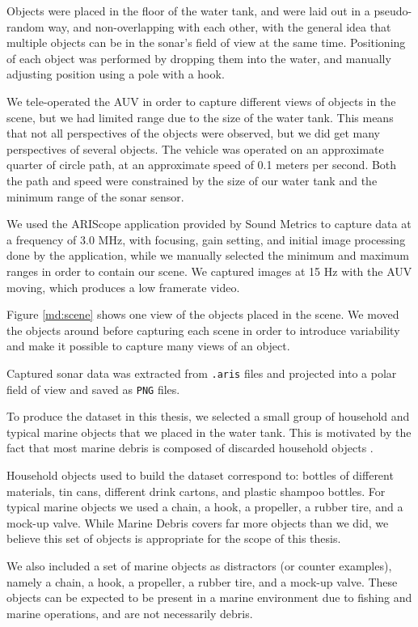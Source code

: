 Objects were placed in the floor of the water tank, and were laid out in a pseudo-random way, and non-overlapping with each other, with the general idea that multiple objects can be in the sonar's field of view at the same time. Positioning of each object was performed by dropping them into the water, and manually adjusting position using a pole with a hook.

We tele-operated the AUV in order to capture different views of objects in the scene, but we had limited range due to the size of the water tank. This means that not all perspectives of the objects were observed, but we did get many perspectives of several objects. The vehicle was operated on an approximate quarter of circle path, at an approximate speed of 0.1 meters per second. Both the path and speed were constrained by the size of our water tank and the minimum range of the sonar sensor.

We used the ARIScope application provided by Sound Metrics to capture data at a frequency of 3.0 MHz, with focusing, gain setting, and initial image processing done by the application, while we manually selected the minimum and maximum ranges in order to contain our scene. We captured images at 15 Hz with the AUV moving, which produces a low framerate video.

Figure \ref{md:scene} shows one view of the objects placed in the scene. We moved the objects around before capturing each scene in order to introduce variability and make it possible to capture many views of an object.

Captured sonar data was extracted from \texttt{.aris} files and projected into a polar field of view and saved as \texttt{PNG} files.

To produce the dataset in this thesis, we selected a small group of household and typical marine objects that we placed in the water tank. This is motivated by the fact that most marine debris is composed of discarded household objects \cite{chiba2018human}.

Household objects used to build the dataset correspond to: bottles of different materials, tin cans, different drink cartons, and plastic shampoo bottles. For typical marine objects we used a chain, a hook, a propeller, a rubber tire, and a mock-up valve. While Marine Debris covers far more objects than we did, we believe this set of objects is appropriate for the scope of this thesis. 

We also included a set of marine objects as distractors (or counter examples), namely a chain, a hook, a propeller, a rubber tire, and a mock-up valve. These objects can be expected to be present in a marine environment \cite{dayton1995environmental} due to fishing and marine operations, and are not necessarily debris.

